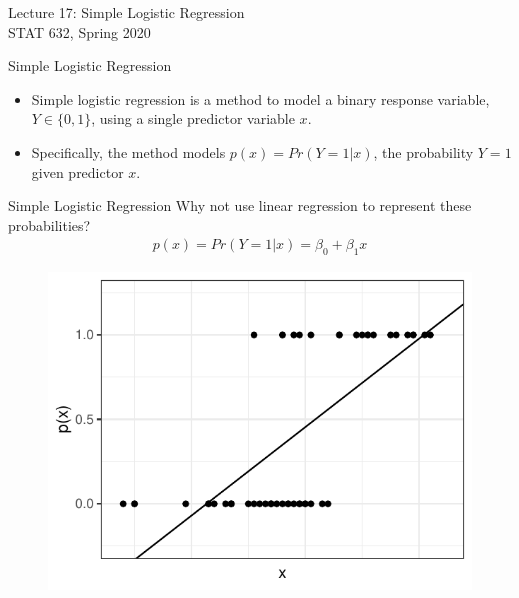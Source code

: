 \documentclass[10pt]{beamer}\usepackage[]{graphicx}\usepackage[]{color}
\begin{document}
\setlength\parindent{0pt}

\begin{frame}
\large
Lecture 17: Simple Logistic Regression\\
STAT 632, Spring 2020\\
\end{frame}

\begin{frame}{Simple Logistic Regression}
\begin{itemize}
\item Simple logistic regression is a method to model a binary response variable, $Y \in \{0,1\}$, using a single predictor variable $x$.
\vspace{10pt}
\item Specifically, the method models $p(x) = Pr(Y=1|x)$, the probability $Y=1$ given predictor $x$.  
\end{itemize}
\end{frame}

\begin{frame}{Simple Logistic Regression}
Why not use linear regression to represent these probabilities?
\begin{align*}
p(x) = Pr(Y=1 | x) = \beta_0 + \beta_1 x
\end{align*}
\begin{figure}
\includegraphics[scale=0.6]{figure/linreg.pdf}
\end{figure}
\end{frame}
\end{document}
